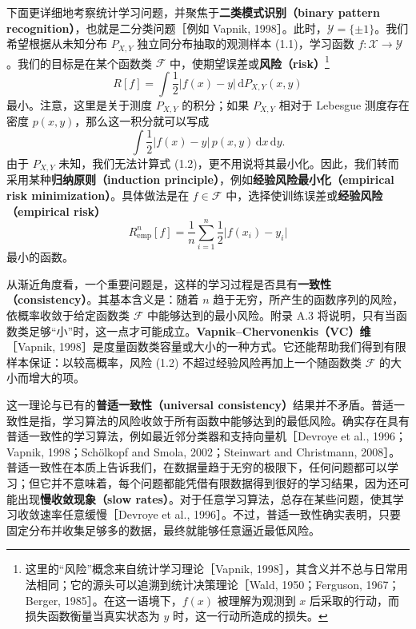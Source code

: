 下面更详细地考察统计学习问题，并聚焦于\textbf{二类模式识别（binary pattern recognition）}，也就是二分类问题［例如 Vapnik, 1998］。此时，$\mathcal{Y}=\{\pm1\}$。我们希望根据从未知分布 $P_{X,Y}$ 独立同分布抽取的观测样本 (1.1)，学习函数 $f\colon\mathcal{X}\to\mathcal{Y}$。我们的目标是在某个函数类 $\mathcal{F}$ 中，使期望误差或\textbf{风险（risk）}\footnote{这里的“风险”概念来自统计学习理论［Vapnik, 1998］，其含义并不总与日常用法相同；它的源头可以追溯到统计决策理论［Wald, 1950；Ferguson, 1967；Berger, 1985］。在这一语境下，$f(x)$ 被理解为观测到 $x$ 后采取的行动，而损失函数衡量当真实状态为 $y$ 时，这一行动所造成的损失。}
\begin{equation}
 R[f]=\int \frac{1}{2}\lvert f(x)-y\rvert\,\mathrm{d}P_{X,Y}(x,y)
 \tag{1.2}
\end{equation}
最小。注意，这里是关于测度 $P_{X,Y}$ 的积分；如果 $P_{X,Y}$ 相对于 Lebesgue 测度存在密度 $p(x,y)$，那么这一积分就可以写成
\[
 \int \frac{1}{2}\lvert f(x)-y\rvert\,p(x,y)\,\mathrm{d}x\,\mathrm{d}y.
\]
由于 $P_{X,Y}$ 未知，我们无法计算式 (1.2)，更不用说将其最小化。因此，我们转而采用某种\textbf{归纳原则（induction principle）}，例如\textbf{经验风险最小化（empirical risk minimization）}。具体做法是在 $f\in\mathcal{F}$ 中，选择使训练误差或\textbf{经验风险（empirical risk）}
\begin{equation}
 R^n_{\mathrm{emp}}[f]
 =\frac{1}{n}\sum_{i=1}^{n}\frac{1}{2}\lvert f(x_i)-y_i\rvert
 \tag{1.3}
\end{equation}
最小的函数。

从渐近角度看，一个重要问题是，这样的学习过程是否具有\textbf{一致性（consistency）}。其基本含义是：随着 $n$ 趋于无穷，所产生的函数序列的风险，依概率收敛于给定函数类 $\mathcal{F}$ 中能够达到的最小风险。附录 A.3 将说明，只有当函数类足够“小”时，这一点才可能成立。\textbf{Vapnik--Chervonenkis（VC）维}［Vapnik, 1998］是度量函数类容量或大小的一种方式。它还能帮助我们得到有限样本保证：以较高概率，风险 (1.2) 不超过经验风险再加上一个随函数类 $\mathcal{F}$ 的大小而增大的项。

这一理论与已有的\textbf{普适一致性（universal consistency）}结果并不矛盾。普适一致性是指，学习算法的风险收敛于所有函数中能够达到的最低风险。确实存在具有普适一致性的学习算法，例如最近邻分类器和支持向量机［Devroye et al., 1996；Vapnik, 1998；Schölkopf and Smola, 2002；Steinwart and Christmann, 2008］。普适一致性在本质上告诉我们，在数据量趋于无穷的极限下，任何问题都可以学习；但它并不意味着，每个问题都能凭借有限数据得到很好的学习结果，因为还可能出现\textbf{慢收敛现象（slow rates）}。对于任意学习算法，总存在某些问题，使其学习收敛速率任意缓慢［Devroye et al., 1996］。不过，普适一致性确实表明，只要固定分布并收集足够多的数据，最终就能够任意逼近最低风险。

